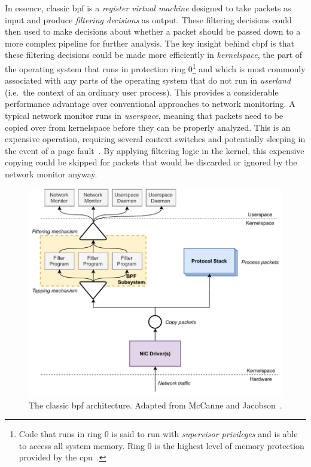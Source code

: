 \documentclass[
  fontsize=12pt,
  titlepage=firstiscover,
  paper=letter,
oneside,
  cleardoublepage=plain,
  parskip=half-,
  DIV=10,
  parindent,
  appendixprefix,
  chapterprefix,
  listof=totoc,
]{scrbook}
\begin{document}
In essence, classic \gls{bpf} is a \textit{register virtual machine} designed to take packets as
input and produce \textit{filtering decisions} as output. These filtering decisions could
then used to make decisions about whether a packet should be passed down to a more complex
pipeline for further analysis. The key insight behind \gls{cbpf} is that these filtering
decisions could be made more efficiently in \textit{kernelspace}, the part of the
operating system that runs in protection ring 0\footnote{Code that runs in ring 0 is said
to run with \textit{supervisor privileges} and is able to access all system memory. Ring
0 is the highest level of memory protection provided by the \gls{cpu}~\cite{jaeger2008_os_security}.}
and which is most commonly associated with any parts of the operating system that do not
run in \textit{userland} (i.e.\ the context of an ordinary user process). This provides
a considerable performance advantage over conventional approaches to network monitoring.
A typical network monitor runs in \textit{userspace}, meaning that packets need to be
copied over from kernelspace before they can be properly analyzed. This is an expensive
operation, requiring several context switches and potentially sleeping in the event of
a page fault~\cite{mccanne1993_bpf}.  By applying filtering logic in the kernel, this
expensive copying could be skipped for packets that would be discarded or ignored by the
network monitor anyway.

\begin{figure}[htbp]
  \centering
  \includegraphics[width=0.8\linewidth]{figs/background/classic-bpf.pdf}
  \caption[The classic BPF architecture]{
    The classic \gls{bpf} architecture. Adapted from McCanne and Jacobson~\cite{mccanne1993_bpf}.
  }\label{fig:classic-bpf}
\end{figure}
\end{document}
